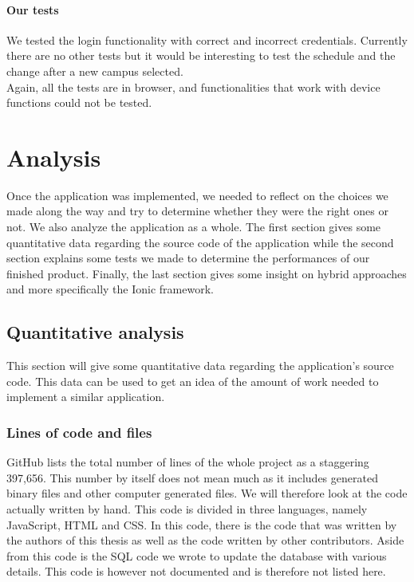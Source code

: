 \documentclass{eplmastersthesis}
\begin{document}
\subsubsection{Our tests}
We tested the login functionality with correct and incorrect credentials.
Currently there are no other tests but it would be interesting to test the schedule and the change after a new campus selected.\\
Again, all the tests are in browser, and functionalities that work with device functions could not be tested. 
\chapter{Analysis}

Once the application was implemented, we needed to reflect on the choices we made along the way and try to determine whether they were the right ones or not. We also analyze the application as a whole. The first section gives some quantitative data regarding the source code of the application while the second section explains some tests we made to determine the performances of our finished product. Finally, the last section gives some insight on hybrid approaches and more specifically the Ionic framework.

\section{Quantitative analysis}

This section will give some quantitative data regarding the application's source code. This data can be used to get an idea of the amount of work needed to implement a similar application.

\subsection{Lines of code and files}

GitHub lists the total number of lines of the whole project as a staggering 397,656. This number by itself does not mean much as it includes generated binary files and other computer generated files. We will therefore look at the code actually written by hand. This code is divided in three languages, namely JavaScript, HTML and CSS. In this code, there is the code that was written by the authors of this thesis as well as the code written by other contributors. Aside from this code is the SQL code we wrote to update the database with various details. This code is however not documented and is therefore not listed here.
\end{document}
